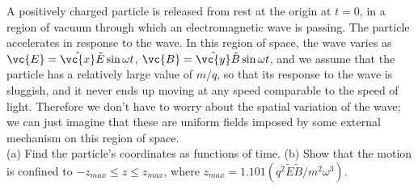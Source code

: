 A positively charged particle is released from rest at the origin at $t=0$,
        in a region of vacuum through which 
        an electromagnetic wave is passing. The particle accelerates in response to
        the wave.
        In this region of space, the wave varies as $\vc{E}=\hat{\vc{x}}\tilde{E}\sin\omega t$,
        $\vc{B}=\hat{\vc{y}}\tilde{B}\sin\omega t$, and we assume that the particle has
        a relatively large value of $m/q$, so that its response to the wave is sluggish,
        and it never ends up moving at any speed comparable to the speed of light. Therefore
        we don't have to worry about the spatial variation of the wave; we can just imagine
        that these are uniform fields imposed by some external mechanism on this region of
        space.\\
        (a) Find the particle's coordinates as functions of time.\answercheck\hwendpart
        (b) Show that the motion is confined to $-z_{max}\leq z \leq z_{max}$,
        where $z_{max} = 1.101\left(q^2\tilde{E}\tilde{B}/m^2\omega^3\right)$.
